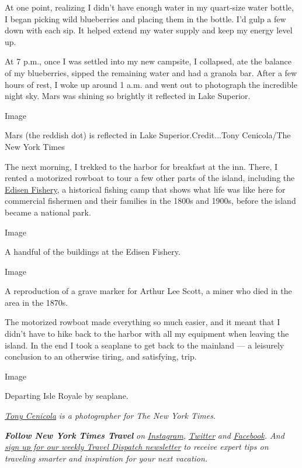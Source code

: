 At one point, realizing I didn't have enough water in my quart-size
water bottle, I began picking wild blueberries and placing them in the
bottle. I'd gulp a few down with each sip. It helped extend my water
supply and keep my energy level up.

At 7 p.m., once I was settled into my new campsite, I collapsed, ate the
balance of my blueberries, sipped the remaining water and had a granola
bar. After a few hours of rest, I woke up around 1 a.m. and went out to
photograph the incredible night sky. Mars was shining so brightly it
reflected in Lake Superior.

Image

Mars (the reddish dot) is reflected in Lake Superior.Credit...Tony
Cenicola/The New York Times

The next morning, I trekked to the harbor for breakfast at the inn.
There, I rented a motorized rowboat to tour a few other parts of the
island, including the
\href{http://iri.forest.mtu.edu/Historic_Fisheries/Pages/Rock_Tobin_Harbor/Edisen.htm}{Edisen
Fishery}, a historical fishing camp that shows what life was like here
for commercial fishermen and their families in the 1800s and 1900s,
before the island became a national park.

Image

A handful of the buildings at the Edisen Fishery.

Image

A reproduction of a grave marker for Arthur Lee Scott, a miner who died
in the area in the 1870s.

The motorized rowboat made everything so much easier, and it meant that
I didn't have to hike back to the harbor with all my equipment when
leaving the island. In the end I took a seaplane to get back to the
mainland --- a leisurely conclusion to an otherwise tiring, and
satisfying, trip.

Image

Departing Isle Royale by seaplane.

\href{https://www.nytimes3xbfgragh.onion/by/tony-cenicola}{\emph{Tony
Cenicola}} \emph{is a photographer for The New York Times.}

\emph{\textbf{Follow New York Times Travel}} \emph{on}
\href{https://www.instagram.com/nytimestravel/}{\emph{Instagram}}\emph{,}
\href{https://twitter.com/nytimestravel}{\emph{Twitter}} \emph{and}
\href{https://www.facebookcorewwwi.onion/nytimestravel/}{\emph{Facebook}}\emph{.
And}
\href{https://www.nytimes3xbfgragh.onion/newsletters/traveldispatch}{\emph{sign
up for our weekly Travel Dispatch newsletter}} \emph{to receive expert
tips on traveling smarter and inspiration for your next vacation.}

